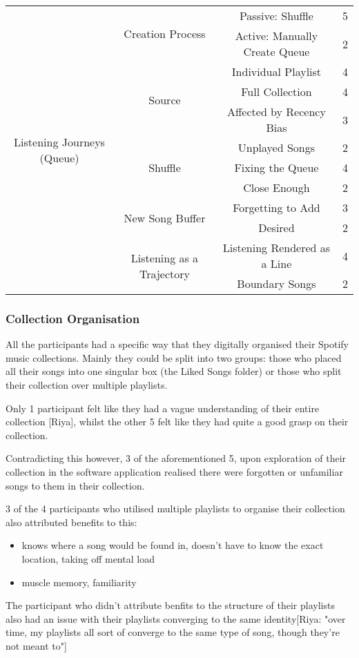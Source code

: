 \begin{longtable}[c]{| c | c | c | c |}
    \multirow{12}{6em}{Listening Journeys (Queue)} & \multirow{2}{*}{Creation Process} & Passive: Shuffle & 5\\*
    & & Active: Manually Create Queue & 2\\*
    & \multirow{3}{*}{Source} & Individual Playlist & 4\\*
    & & Full Collection & 4\\*
    & & Affected by Recency Bias & 3\\*
    & \multirow{3}{*}{Shuffle} & Unplayed Songs & 2\\*
    & & Fixing the Queue & 4\\*
    & & Close Enough & 2\\*
    & \multirow{2}{*}{New Song Buffer} & Forgetting to Add & 3\\*
    & & Desired & 2\\*
    & \multirow{2}{*}{Listening as a Trajectory} & Listening Rendered as a Line & 4\\*
    & & Boundary Songs & 2\\*%
    \midrule
\end{longtable}

\subsubsection{Collection Organisation}%
All the participants had a specific way that they digitally organised their Spotify music collections. Mainly they could be split into two groups: those who placed all their songs into one singular box (the Liked Songs folder) or those who split their collection over multiple playlists.

Only 1 participant felt like they had a vague understanding of their entire collection [Riya], whilst the other 5 felt like they had quite a good grasp on their collection.

Contradicting this however, 3 of the aforementioned 5, upon exploration of their collection in the software application realised there were forgotten or unfamiliar songs to them in their collection.

3 of the 4 participants who utilised multiple playlists to organise their collection also attributed benefits to this:\begin{itemize}
    \item knows where a song would be found in, doesn't have to know the exact location, taking off mental load
    \item muscle memory, familiarity
\end{itemize}
The participant who didn't attribute benfits to the structure of their playlists also had an issue with their playlists converging to the same identity[Riya: "over time, my playlists all sort of converge to the same type of song, though they're not meant to"]

